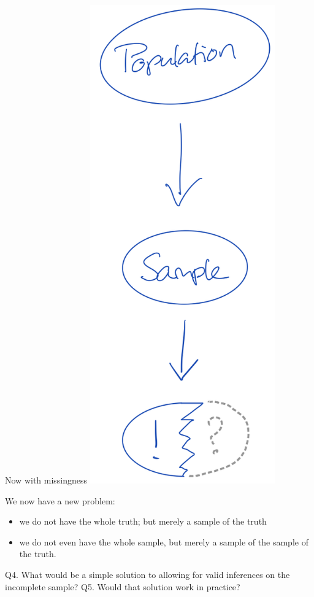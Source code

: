 \documentclass[
  ignorenonframetext,
]{beamer}
\providecommand{\tightlist}{%
  \setlength{\itemsep}{0pt}\setlength{\parskip}{0pt}}\usepackage{longtable,booktabs,array}
\begin{document}
\begin{frame}{Now with missingness}
\protect\hypertarget{now-with-missingness}{}
\includegraphics[width=0.6\textwidth,height=\textheight]{img/9.missingness.png}

We now have a new problem:

\begin{itemize}
\tightlist
\item
  we do not have the whole truth; but merely a sample of the truth
\item
  we do not even have the whole sample, but merely a sample of the
  sample of the truth.
\end{itemize}

Q4. What would be a simple solution to allowing for valid inferences on
the incomplete sample? Q5. Would that solution work in practice?
\end{frame}
\end{document}
